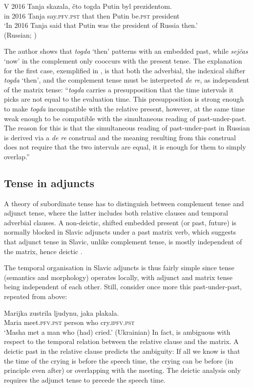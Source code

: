 \documentclass[output=paper,colorlinks,citecolor=brown]{langscibook}
\begin{document}
\ea\label{vos}\gll
V 2016 Tanja skazala, čto togda Putin byl prezidentom.\\
in 2016 Tanja say.\textsc{pfv}.\textsc{pst} that then Putin be.\textsc{pst} president\\
\glt ‘In 2016 Tanja said that Putin was the president of Russia then.’\\\hfill (Russian; \cite{vostrikova18})
\z

\noindent The author shows that {\textit{togda}} `then' patterns with an embedded past, while {\textit{sej\-čas}} `now' in the complement only cooccurs with the present tense.
The explanation for the first case, exemplified in , is that both the adverbial, the indexical shifter {\textit{togda}} `then', and the complement tense must be interpreted \textit{de re}, as independent of the matrix tense: 
``{\textit{togda}} carries a presupposition that the time intervals it picks are not equal to
the evaluation time. This presupposition is strong enough to
make {\textit{togda}} incompatible with the relative present, however, at the same time weak enough to be
compatible with the simultaneous reading of past-under-past. The reason for this
is that the simultaneous reading of past-under-past in Russian is derived via a \textit{de re} construal and the meaning resulting from this construal does not require that
the two intervals are equal, it is enough for them to simply overlap.'' \citep[475]{vostrikova18}


\subsection{Tense in adjuncts}\label{sec:deep}
A theory of subordinate tense  has to distinguish between complement tense and adjunct tense, where the latter includes both relative clauses and temporal adverbial clauses. A non-deictic, shifted embedded present (or past, future) is normally blocked in Slavic adjuncts under a past matrix verb, which suggests that adjunct tense in Slavic, unlike complement tense, is mostly independent of the matrix, hence deictic \citep{kubota11}.

The temporal organisation in Slavic adjuncts is thus fairly simple since  tense (semantics and morphology) operates locally, with adjunct and  matrix tense being independent of each other. 
Still, consider once more this past-under-past, repeated from above:

\ea\label{rel-papa1}\gll
Marijka zustrila ljudynu, jaka   plakala.\\
Maria meet.\textsc{pfv}.\textsc{pst} person who cry.\textsc{ipfv}.\textsc{pst} \\ 
\glt
 ‘Masha met a man who (had) cried.' \hfill (Ukrainian)
\z
In fact,  is ambiguous with respect to the temporal relation between the relative clause and the matrix. A deictic past in the relative clause predicts the ambiguity: If all we know is that the time of the crying is before the speech time, the crying can be before (in principle even after) or overlapping with the meeting.
The deictic analysis only requires the adjunct tense to precede the speech time.
\end{document}
